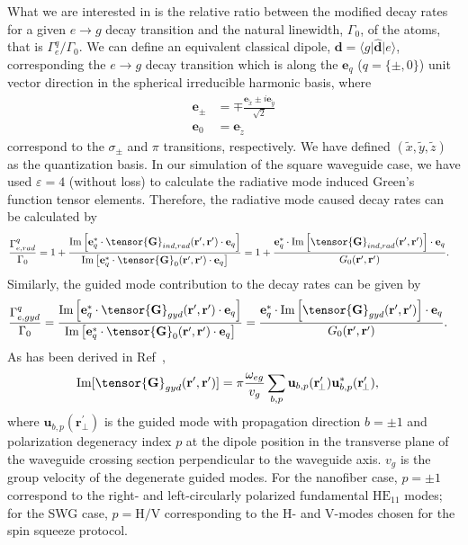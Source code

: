 \documentclass[preprint,aps,pra,onecolumn,superscriptaddress]{revtex4-1} %
\def\br{\mathbf{r}}
\def\bra#1{\langle{#1}\rvert}%
\def\ket#1{\lvert{#1}\rangle}%
\begin{document}
\begin{appendix}
    
What we are interested in is the relative ratio between the modified decay rates for a given $e\rightarrow g$ decay transition and the natural linewidth, $ \Gamma_0 $, of the atoms, that is $ \Gamma_e^q/\Gamma_0 $. 
We can define an equivalent classical dipole, $ \mathbf{d}=\bra{g}\hat{\mathbf{d}}\ket{e} $, corresponding the $ e\rightarrow g $ decay transition which is along the $ \mathbf{e}_q $ ($q=\{\pm,0\}$) unit vector direction in the spherical irreducible harmonic basis, where
\begin{align}
    \mathbf{e}_\pm &=\mp \frac{\mathbf{e}_{\tilde{x}}\pm i\mathbf{e}_{\tilde{y}}}{\sqrt{2}}\\
    \mathbf{e}_0 &=\mathbf{e}_{\tilde{z}}
\end{align}
correspond to the $\sigma_\pm$ and $\pi$ transitions, respectively.
We have defined $ (\tilde{x},\tilde{y},\tilde{z}) $ as the quantization basis.
In our simulation of the square waveguide case, we have used $\varepsilon=4$ (without loss) to calculate the radiative mode induced Green's function tensor elements.
Therefore, the radiative mode caused decay rates can be calculated by
\begin{align}
\frac{\Gamma_{e,rad}^{q}}{\Gamma_0} &= 1+ \frac{\mathrm{Im}\left[\mathbf{e}_q^*\cdot \tensor{\mathbf{G}}_{ind,rad}(\mathbf{r}',\mathbf{r}')\cdot \mathbf{e}_q\right]}{ \mathrm{Im}\left[\mathbf{e}_q^*\cdot \tensor{\mathbf{G}}_0(\mathbf{r}',\mathbf{r}')\cdot \mathbf{e}_q\right]}
=1+ \frac{\mathbf{e}_q^*\cdot \mathrm{Im}\left[\tensor{\mathbf{G}}_{ind,rad}(\mathbf{r}',\mathbf{r}')\right]\cdot \mathbf{e}_q}{G_0(\mathbf{r}',\mathbf{r}')}.
\end{align}
Similarly, the guided mode contribution to the decay rates can be given by
\begin{align}
\frac{\Gamma_{e,gyd}^{q}}{\Gamma_0} &= \frac{\mathrm{Im}\left[\mathbf{e}_q^*\cdot \tensor{\mathbf{G}}_{gyd}(\mathbf{r}',\mathbf{r}')\cdot \mathbf{e}_q\right]}{ \mathrm{Im}\left[\mathbf{e}_q^*\cdot \tensor{\mathbf{G}}_0(\mathbf{r}',\mathbf{r}')\cdot \mathbf{e}_q\right]}
= \frac{\mathbf{e}_q^*\cdot \mathrm{Im}\left[ \tensor{\mathbf{G}}_{gyd}(\mathbf{r}',\mathbf{r}')\right]\cdot \mathbf{e}_q}{ G_0(\mathbf{r}',\mathbf{r}')}.
\end{align}
As has been derived in Ref~\cite{Qi2016},
\begin{align}
\mathrm{Im}[\tensor{\mathbf{G}}_{gyd}(\br',\br')] &= \pi \frac{\omega_{eg}}{v_g } \sum_{b, p} 
		\mathbf{u}_{b, p} (\br_{\!\perp}^\prime)\mathbf{u}^*_{b , p} (\br_{\!\perp}^\prime),
\end{align}
where $\mathbf{u}_{b, p} (\br_{\!\perp}^\prime)$ is the guided mode with propagation direction $ b=\pm 1 $ and polarization degeneracy index $ p $ at the dipole position in the transverse plane of the waveguide crossing section perpendicular to the waveguide axis.
$v_g$ is the group velocity of the degenerate guided modes.
For the nanofiber case, $ p=\pm 1 $ correspond to the right- and left-circularly polarized fundamental $\mathrm{HE}_{11}$ modes; 
for the SWG case, $ p=\mathrm{H}/\mathrm{V} $ corresponding to the H- and V-modes chosen for the spin squeeze protocol.


\end{appendix}
\end{document}
